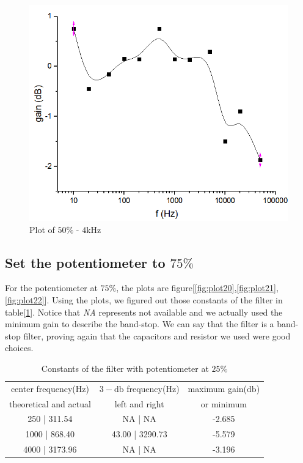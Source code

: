 \begin{figure}
	\centering
	\begin{framed}
		\includegraphics[width=\linewidth]{images/12.PNG}
		\caption{Plot of $50\%$ - $4\si{\kilo\hertz}$}
		\label{fig:plot12}
	\end{framed}
\end{figure}

\subsection{Set the potentiometer to $75\%$}
For the potentiometer at $75\%$, the plots are figure[\ref{fig:plot20},\ref{fig:plot21},\ref{fig:plot22}]. Using the plots, we figured out those constants of the filter in table[\ref{tab:cnst2}]. Notice that \textit{NA} represents not available and we actually used the minimum gain to describe the band-stop. We can say that the filter is a band-stop filter, proving again that the capacitors and resistor we used were good choices.

\begin{table}[!htbp]
	\centering
	\caption{Constants of the filter with potentiometer at $25\%$}
	\label{tab:cnst2}
	\begin{tabular}{ccc}
		\toprule
		center frequency($\si{\hertz}$) & $3-\si{\decibel}$ frequency($\si{\hertz}$) & maximum gain($\si{\decibel}$) \\
		theoretical and actual & left and right & or minimum\\
		\midrule
		250 | 311.54 & NA | NA & -2.685\\
		1000 | 868.40 & 43.00 | 3290.73 & -5.579\\
		4000 | 3173.96 & NA | NA & -3.196\\
		\bottomrule
	\end{tabular}
\end{table}

